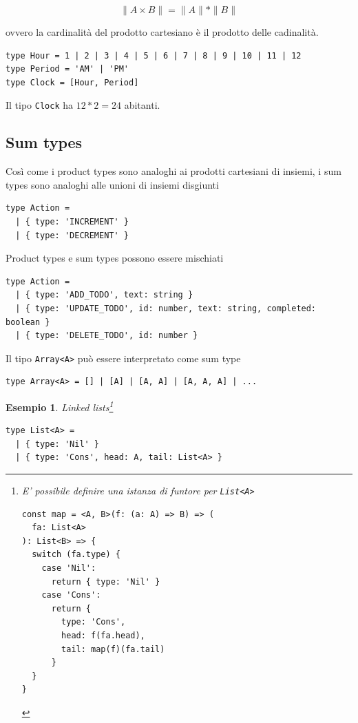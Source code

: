 \documentclass[12pt]{article}
\newtheorem{example}{Esempio}
\begin{document}
$$
\|A \times B\| = \|A\| * \|B\|
$$

ovvero la cardinalità del prodotto cartesiano è il prodotto delle cadinalità.

\begin{verbatim}
type Hour = 1 | 2 | 3 | 4 | 5 | 6 | 7 | 8 | 9 | 10 | 11 | 12
type Period = 'AM' | 'PM'
type Clock = [Hour, Period]
\end{verbatim}

Il tipo \texttt{Clock} ha $12 * 2 = 24$ abitanti.

\subsection{Sum types}

Così come i product types sono analoghi ai prodotti cartesiani di insiemi, i sum types sono analoghi alle unioni di insiemi disgiunti

\begin{verbatim}
type Action =
  | { type: 'INCREMENT' }
  | { type: 'DECREMENT' }
\end{verbatim}

Product types e sum types possono essere mischiati

\begin{verbatim}
type Action =
  | { type: 'ADD_TODO', text: string }
  | { type: 'UPDATE_TODO', id: number, text: string, completed: boolean }
  | { type: 'DELETE_TODO', id: number }
\end{verbatim}

Il tipo \texttt{Array<A>} può essere interpretato come sum type

\begin{verbatim}
type Array<A> = [] | [A] | [A, A] | [A, A, A] | ...
\end{verbatim}

\begin{example}
Linked lists\footnote{E' possibile definire una istanza di funtore per \texttt{List<A>}

\begin{verbatim}
const map = <A, B>(f: (a: A) => B) => (
  fa: List<A>
): List<B> => {
  switch (fa.type) {
    case 'Nil':
      return { type: 'Nil' }
    case 'Cons':
      return {
        type: 'Cons',
        head: f(fa.head),
        tail: map(f)(fa.tail)
      }
  }
}
\end{verbatim}
}

\begin{verbatim}
type List<A> =
  | { type: 'Nil' }
  | { type: 'Cons', head: A, tail: List<A> }
\end{verbatim}
\end{example}
\end{document}
